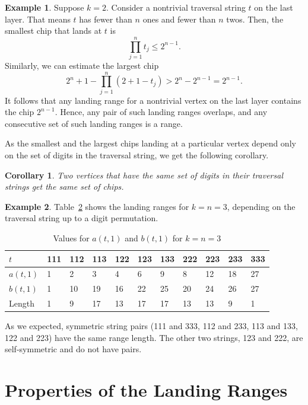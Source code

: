 \documentclass[11pt]{article}
\newtheorem{corollary}{Corollary}[theorem] %
\theoremstyle{definition}
\newtheorem{example}{Example}
\theoremstyle{remark}
\begin{document}
\begin{example}
    Suppose $k=2$. Consider a nontrivial traversal string $t$ on the last layer. That means $t$ has fewer than $n$ ones and fewer than $n$ twos. Then, the smallest chip that lands at $t$ is
    \[\prod_{j=1}^n t_j \leq 2^{n-1}.\]
    Similarly, we can estimate the largest chip
    \[2^n+1-\prod_{j=1}^n(2+1-t_j) > 2^n - 2^{n-1} = 2^{n-1}.\]
    It follows that any landing range for a nontrivial vertex on the last layer contains the chip $2^{n-1}$. Hence, any pair of such landing ranges overlaps, and any consecutive set of such landing ranges is a range.
\end{example}

As the smallest and the largest chips landing at a particular vertex depend only on the set of digits in the traversal string, we get the following corollary.

\begin{corollary}\label{cor:PermutingTheTraversalString}
     Two vertices that have the same set of digits in their traversal strings get the same set of chips.
\end{corollary}

\begin{example}
Table~\ref{tab:ranges3-3} shows the landing ranges for $k=n=3$, depending on the traversal string up to a digit permutation.

\begin{table}[h!]\caption{Values for $a(t, 1)$ and $b(t, 1)$ for $k=n=3$ \label{tab:FirstThing}}
\centering
\begin{tabular}{|l|l|l|l|l|l|l|l|l|l|l|}
\hline
$t$              & 111 & 112 & 113 & 122 & 123 & 133 & 222 & 223 & 233 & 333 \\ \hline
$a(t,1)$ & 1 & 2 & 3 & 4 & 6 & 9 & 8 & 12 & 18 & 27 \\ \hline
$b(t,1)$ & 1 & 10 & 19 & 16 & 22 & 25 & 20 & 24 & 26 & 27 \\ \hline
Length & 1 & 9 & 17  & 13  & 17 & 17 & 13 & 13 & 9 & 1 \\ \hline
\end{tabular}
\label{tab:ranges3-3}
\end{table}
As we expected, symmetric string pairs (111 and 333, 112 and 233, 113 and 133, 122 and 223) have the same range length. The other two strings, 123 and 222, are self-symmetric and do not have pairs.
\end{example}


\section{Properties of the Landing Ranges}
\label{sec:propertiesofranges}
\end{document}
